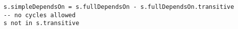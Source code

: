 \lstset{frame=tb, aboveskip=12pt, belowskip=-3pt, breaklines=true, basicstyle=\small\ttfamily, tabsize=2, mathescape=true}
\begin{lstlisting}[caption={base\_facts.als, lines 27-31}, label=alloy:simple-depends, captionpos=b]
s.simpleDependsOn = s.fullDependsOn - s.fullDependsOn.transitive
-- no cycles allowed
s not in s.transitive
\end{lstlisting}
